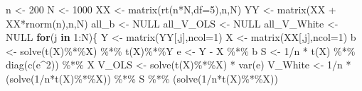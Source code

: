 \documentclass[
]{book}
\newenvironment{Shaded}{\begin{snugshade}}{\end{snugshade}}
\newcommand{\AttributeTok}[1]{\textcolor[rgb]{0.77,0.63,0.00}{#1}}
\newcommand{\ConstantTok}[1]{\textcolor[rgb]{0.00,0.00,0.00}{#1}}
\newcommand{\ControlFlowTok}[1]{\textcolor[rgb]{0.13,0.29,0.53}{\textbf{#1}}}
\newcommand{\DecValTok}[1]{\textcolor[rgb]{0.00,0.00,0.81}{#1}}
\newcommand{\FunctionTok}[1]{\textcolor[rgb]{0.00,0.00,0.00}{#1}}
\newcommand{\NormalTok}[1]{#1}
\newcommand{\OtherTok}[1]{\textcolor[rgb]{0.56,0.35,0.01}{#1}}
\newcommand{\SpecialCharTok}[1]{\textcolor[rgb]{0.00,0.00,0.00}{#1}}
\theoremstyle{definition}
\theoremstyle{definition}
\theoremstyle{definition}
\theoremstyle{definition}
\theoremstyle{remark}
\begin{document}
\begin{Shaded}
\begin{Highlighting}[]
\NormalTok{n }\OtherTok{\textless{}{-}} \DecValTok{200}
\NormalTok{N }\OtherTok{\textless{}{-}} \DecValTok{1000}
\NormalTok{XX }\OtherTok{\textless{}{-}} \FunctionTok{matrix}\NormalTok{(}\FunctionTok{rt}\NormalTok{(n}\SpecialCharTok{*}\NormalTok{N,}\AttributeTok{df=}\DecValTok{5}\NormalTok{),n,N)}
\NormalTok{YY }\OtherTok{\textless{}{-}} \FunctionTok{matrix}\NormalTok{(XX }\SpecialCharTok{+}\NormalTok{ XX}\SpecialCharTok{*}\FunctionTok{rnorm}\NormalTok{(n),n,N)}
\NormalTok{all\_b       }\OtherTok{\textless{}{-}} \ConstantTok{NULL}
\NormalTok{all\_V\_OLS   }\OtherTok{\textless{}{-}} \ConstantTok{NULL}
\NormalTok{all\_V\_White }\OtherTok{\textless{}{-}} \ConstantTok{NULL}
\ControlFlowTok{for}\NormalTok{(j }\ControlFlowTok{in} \DecValTok{1}\SpecialCharTok{:}\NormalTok{N)\{}
\NormalTok{  Y }\OtherTok{\textless{}{-}} \FunctionTok{matrix}\NormalTok{(YY[,j],}\AttributeTok{ncol=}\DecValTok{1}\NormalTok{)}
\NormalTok{  X }\OtherTok{\textless{}{-}} \FunctionTok{matrix}\NormalTok{(XX[,j],}\AttributeTok{ncol=}\DecValTok{1}\NormalTok{)}
\NormalTok{  b }\OtherTok{\textless{}{-}} \FunctionTok{solve}\NormalTok{(}\FunctionTok{t}\NormalTok{(X)}\SpecialCharTok{\%*\%}\NormalTok{X) }\SpecialCharTok{\%*\%} \FunctionTok{t}\NormalTok{(X)}\SpecialCharTok{\%*\%}\NormalTok{Y}
\NormalTok{  e }\OtherTok{\textless{}{-}}\NormalTok{ Y }\SpecialCharTok{{-}}\NormalTok{ X }\SpecialCharTok{\%*\%}\NormalTok{ b}
\NormalTok{  S }\OtherTok{\textless{}{-}} \DecValTok{1}\SpecialCharTok{/}\NormalTok{n }\SpecialCharTok{*} \FunctionTok{t}\NormalTok{(X) }\SpecialCharTok{\%*\%} \FunctionTok{diag}\NormalTok{(}\FunctionTok{c}\NormalTok{(e}\SpecialCharTok{\^{}}\DecValTok{2}\NormalTok{)) }\SpecialCharTok{\%*\%}\NormalTok{ X}
\NormalTok{  V\_OLS   }\OtherTok{\textless{}{-}} \FunctionTok{solve}\NormalTok{(}\FunctionTok{t}\NormalTok{(X)}\SpecialCharTok{\%*\%}\NormalTok{X) }\SpecialCharTok{*} \FunctionTok{var}\NormalTok{(e)}
\NormalTok{  V\_White }\OtherTok{\textless{}{-}} \DecValTok{1}\SpecialCharTok{/}\NormalTok{n }\SpecialCharTok{*}\NormalTok{ (}\FunctionTok{solve}\NormalTok{(}\DecValTok{1}\SpecialCharTok{/}\NormalTok{n}\SpecialCharTok{*}\FunctionTok{t}\NormalTok{(X)}\SpecialCharTok{\%*\%}\NormalTok{X)) }\SpecialCharTok{\%*\%}\NormalTok{ S }\SpecialCharTok{\%*\%}\NormalTok{ (}\FunctionTok{solve}\NormalTok{(}\DecValTok{1}\SpecialCharTok{/}\NormalTok{n}\SpecialCharTok{*}\FunctionTok{t}\NormalTok{(X)}\SpecialCharTok{\%*\%}\NormalTok{X))}
  

\end{Highlighting}
\end{Shaded}
\end{document}
